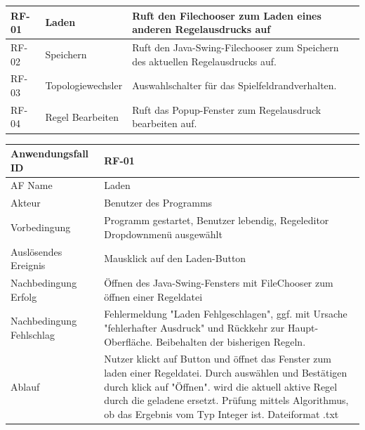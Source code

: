 \documentclass[11pt,a4paper]{article}
\begin{document}
\begin{longtable}[m]{|m{2cm}|m{4cm}|m{9cm}|} %
		\hline
		RF-01 & Laden & Ruft den Filechooser zum Laden eines anderen Regelausdrucks auf \\
		\hline
		RF-02 & Speichern & Ruft den Java-Swing-Filechooser zum Speichern des aktuellen Regelausdrucks auf. \\
		\hline
		RF-03 & Topologiewechsler & Auswahlschalter für das Spielfeldrandverhalten. \\
		\hline
		RF-04 & Regel Bearbeiten & Ruft das Popup-Fenster zum Regelausdruck bearbeiten auf. \\
		\hline
\end{longtable}
\pagebreak


     \begin{tabular}[m]{|m{7cm}|m{9cm}|}
          \hline
          Anwendungsfall ID     & RF-01 \\ %
          \hline
          AF Name     &  Laden \\
          \hline
          Akteur&Benutzer des Programms \\
          \hline
          Vorbedingung&Programm gestartet, Benutzer lebendig, Regeleditor Dropdownmenü ausgewählt\\
          \hline
          Auslösendes Ereignis&Mausklick auf den Laden-Button\\
          \hline
          Nachbedingung Erfolg&Öffnen des Java-Swing-Fensters mit FileChooser zum öffnen einer Regeldatei\\
          \hline
          Nachbedingung Fehlschlag&Fehlermeldung "Laden Fehlgeschlagen", ggf. mit Ursache "fehlerhafter Ausdruck" und Rückkehr zur Haupt-Oberfläche. Beibehalten der bisherigen Regeln.\\
          \hline
          Ablauf&Nutzer klickt auf Button und öffnet das Fenster zum laden einer Regeldatei. Durch auswählen und Bestätigen durch klick auf "Öffnen". wird die aktuell aktive Regel durch die geladene ersetzt.
          Prüfung mittels Algorithmus, ob das Ergebnis vom Typ Integer ist. Dateiformat .txt\\
          \hline
     \end{tabular}
     \par
     
\end{document}
